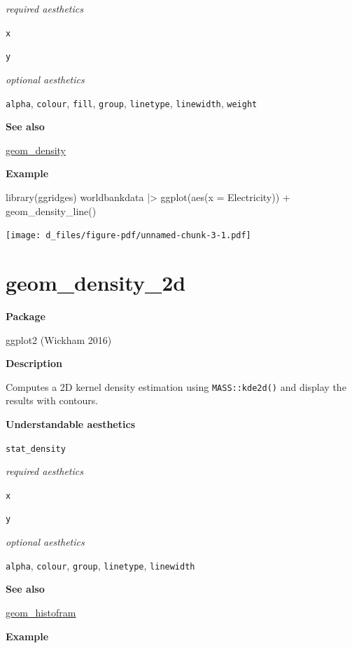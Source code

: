 \documentclass[
  letterpaper,
  DIV=11,
  numbers=noendperiod]{scrreprt}
\newenvironment{Shaded}{\begin{snugshade}}{\end{snugshade}}
\newcommand{\AttributeTok}[1]{\textcolor[rgb]{0.40,0.45,0.13}{#1}}
\newcommand{\FunctionTok}[1]{\textcolor[rgb]{0.28,0.35,0.67}{#1}}
\newcommand{\NormalTok}[1]{\textcolor[rgb]{0.00,0.23,0.31}{#1}}
\newcommand{\SpecialCharTok}[1]{\textcolor[rgb]{0.37,0.37,0.37}{#1}}
\begin{document}
\emph{required aesthetics}

\texttt{x}

\texttt{y}

\emph{optional aesthetics}

\texttt{alpha}, \texttt{colour}, \texttt{fill}, \texttt{group},
\texttt{linetype}, \texttt{linewidth}, \texttt{weight}

\textbf{See also}

\hyperref[density]{geom\_density}

\textbf{Example}

\begin{Shaded}
\begin{Highlighting}[]
\FunctionTok{library}\NormalTok{(ggridges)}
\NormalTok{worldbankdata }\SpecialCharTok{|\textgreater{}}
  \FunctionTok{ggplot}\NormalTok{(}\FunctionTok{aes}\NormalTok{(}\AttributeTok{x =}\NormalTok{ Electricity)) }\SpecialCharTok{+}   
  \FunctionTok{geom\_density\_line}\NormalTok{()}
\end{Highlighting}
\end{Shaded}

\texttt{[image: d\_files/figure-pdf/unnamed-chunk-3-1.pdf]}

\section{geom\_density\_2d}\label{density_2d}

\textbf{Package}

ggplot2 (Wickham 2016)

\textbf{Description}

Computes a 2D kernel density estimation using \texttt{MASS::kde2d()} and
display the results with contours.

\textbf{Understandable aesthetics}

\texttt{stat\_density}

\emph{required aesthetics}

\texttt{x}

\texttt{y}

\emph{optional aesthetics}

\texttt{alpha}, \texttt{colour}, \texttt{group}, \texttt{linetype},
\texttt{linewidth}

\textbf{See also}

\hyperref[hist]{geom\_histofram}

\textbf{Example}
\end{document}
